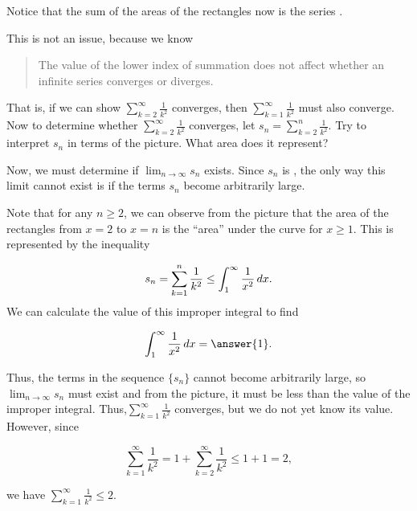 \documentclass{ximera}
\begin{document}
\begin{model}
\begin{image}
\end{image}
Notice that the sum of the areas of the rectangles now is the series .

This is not an issue, because we know

\begin{quote}
The value of the lower index of summation does not affect whether an infinite series converges or diverges.
\end{quote}

That is, if we can show $\sum_{k=2}^{\infty} \frac{1}{k^2}$ converges, then $\sum_{k=1}^{\infty} \frac{1}{k^2}$ must also converge.  Now to determine whether $\sum_{k=2}^{\infty} \frac{1}{k^2}$ converges, let $s_n = \sum_{k=2}^n \frac{1}{k^2}$.  Try to interpret $s_n$ in terms of the picture.  What area does it represent?

Now, we must determine if $\lim_{n \to \infty} s_n$ exists.  Since $s_n$ is , the only way this limit cannot exist is if the terms $s_n$ become arbitrarily large.

Note that for any $n \geq 2$, we can observe from the picture that the area of the rectangles from $x=2$ to $x=n$ is  the ``area'' under the curve for $x \geq 1$.  This is represented by the inequality

\[
s_n = \sum_{k=1}^n\frac{1}{k^2} \leq
\int_1^\infty \frac{1}{x^2} \mathop{}\!d x.
\]
We can calculate the value of this improper integral to find

\[
\int_1^\infty \frac{1}{x^2} \d x = \answer{1}.
\]

Thus, the terms in the sequence $\{s_n\}$ cannot become arbitrarily large, so $\lim_{n \to \infty} s_n$ must exist and from the picture, it must be less than the value of the improper integral.  Thus,$\sum_{k=1}^{\infty} \frac{1}{k^2}$  converges, but we do not yet know its value.  However, since 


\[\sum_{k=1}^{\infty} \frac{1}{k^2} = 1 +  \sum_{k=2}^{\infty} \frac{1}{k^2} \leq 1 + 1 =2, \] 

we have  $\sum_{k=1}^{\infty} \frac{1}{k^2} \leq 2$.


\end{model}
\end{document}
